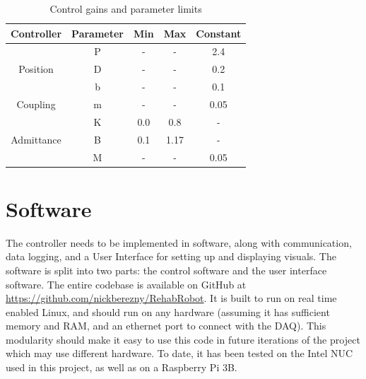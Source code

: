\documentclass[12pt]{report}
\begin{document}
	\begin{table}[h] \label{tab:params}
	\centering
	\caption{Control gains and parameter limits}
	\begin{tabular}{c c c c c }
	\toprule
	Controller & Parameter & Min & Max & Constant  \\
	\midrule
	\rowcolor{gray!10} \cellcolor{white} & P & - & -  & 2.4  \\
	\multirow{-2}{*}{Position} \cellcolor{white} & D & - & - & 0.2 \\
	\midrule
	\rowcolor{gray!10} \cellcolor{white} & b & -  & -  & 0.1  \\
	\multirow{-2}{*}{Coupling} \cellcolor{white} & m & -  & -  & 0.05  \\
	\midrule
	\rowcolor{gray!10} \cellcolor{white} & K & 0.0 & 0.8  &  - \\
	\multirow{-1}{*}{Admittance} \cellcolor{white} & B & 0.1 & 1.17  & - \\
	\rowcolor{gray!10} \cellcolor{white} & M & - & -  & 0.05  \\
	\bottomrule
	\end{tabular}
	\end{table}	
	
	
			
	\section{Software} \label{sec:software} 

	The controller needs to be implemented in software, along with communication, data logging, and a User Interface for setting up and displaying visuals. The software is split into two parts: the control software and the user interface software. The entire codebase is available on GitHub at \href{https://github.com/nickberezny/RehabRobot}{https://github.com/nickberezny/RehabRobot}. It is built to run on real time enabled Linux, and should run on any hardware (assuming it has sufficient memory and RAM, and an ethernet port to connect with the DAQ). This modularity should make it easy to use this code in future iterations of the project which may use different hardware. To date, it has been tested on the Intel NUC used in this project, as well as on a Raspberry Pi 3B. 
	
\end{document}
